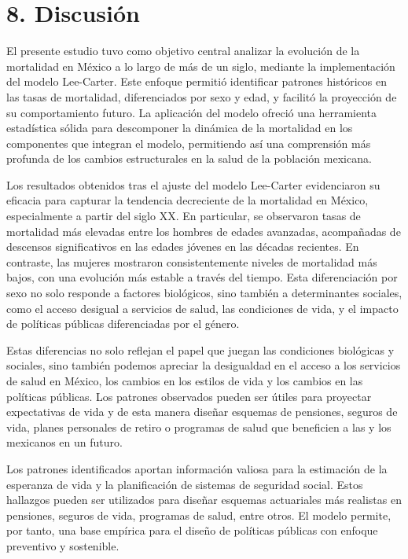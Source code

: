 \documentclass[
]{article}
\begin{document}
\clearpage

\hypertarget{discusiuxf3n}{%
\section{8. Discusión}\label{discusiuxf3n}}

El presente estudio tuvo como objetivo central analizar la evolución de
la mortalidad en México a lo largo de más de un siglo, mediante la
implementación del modelo Lee-Carter. Este enfoque permitió identificar
patrones históricos en las tasas de mortalidad, diferenciados por sexo y
edad, y facilitó la proyección de su comportamiento futuro. La
aplicación del modelo ofreció una herramienta estadística sólida para
descomponer la dinámica de la mortalidad en los componentes que integran
el modelo, permitiendo así una comprensión más profunda de los cambios
estructurales en la salud de la población mexicana.

Los resultados obtenidos tras el ajuste del modelo Lee-Carter
evidenciaron su eficacia para capturar la tendencia decreciente de la
mortalidad en México, especialmente a partir del siglo XX. En
particular, se observaron tasas de mortalidad más elevadas entre los
hombres de edades avanzadas, acompañadas de descensos significativos en
las edades jóvenes en las décadas recientes. En contraste, las mujeres
mostraron consistentemente niveles de mortalidad más bajos, con una
evolución más estable a través del tiempo. Esta diferenciación por sexo
no solo responde a factores biológicos, sino también a determinantes
sociales, como el acceso desigual a servicios de salud, las condiciones
de vida, y el impacto de políticas públicas diferenciadas por el género.

Estas diferencias no solo reflejan el papel que juegan las condiciones
biológicas y sociales, sino también podemos apreciar la desigualdad en
el acceso a los servicios de salud en México, los cambios en los estilos
de vida y los cambios en las políticas públicas. Los patrones observados
pueden ser útiles para proyectar expectativas de vida y de esta manera
diseñar esquemas de pensiones, seguros de vida, planes personales de
retiro o programas de salud que beneficien a las y los mexicanos en un
futuro.

Los patrones identificados aportan información valiosa para la
estimación de la esperanza de vida y la planificación de sistemas de
seguridad social. Estos hallazgos pueden ser utilizados para diseñar
esquemas actuariales más realistas en pensiones, seguros de vida,
programas de salud, entre otros. El modelo permite, por tanto, una base
empírica para el diseño de políticas públicas con enfoque preventivo y
sostenible.
\end{document}
